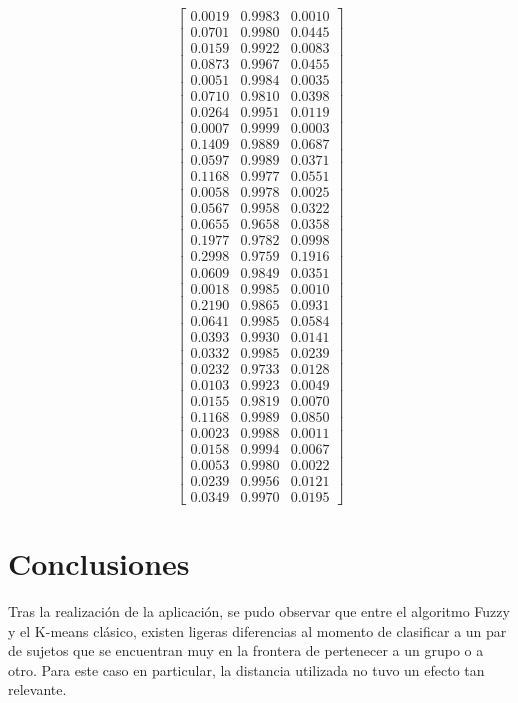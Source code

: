 \documentclass[11pt, letterpaper]{article}
\begin{document}
\[
\begin{bmatrix}
	0.0019 & 0.9983 & 0.0010 \\
	0.0701 & 0.9980 & 0.0445 \\
	0.0159 & 0.9922 & 0.0083 \\
	0.0873 & 0.9967 & 0.0455 \\
	0.0051 & 0.9984 & 0.0035 \\
	0.0710 & 0.9810 & 0.0398 \\
	0.0264 & 0.9951 & 0.0119 \\
	0.0007 & 0.9999 & 0.0003 \\
	0.1409 & 0.9889 & 0.0687 \\
	0.0597 & 0.9989 & 0.0371 \\
	0.1168 & 0.9977 & 0.0551 \\
	0.0058 & 0.9978 & 0.0025 \\
	0.0567 & 0.9958 & 0.0322 \\
	0.0655 & 0.9658 & 0.0358 \\
	0.1977 & 0.9782 & 0.0998 \\
	0.2998 & 0.9759 & 0.1916 \\
	0.0609 & 0.9849 & 0.0351 \\
	0.0018 & 0.9985 & 0.0010 \\
	0.2190 & 0.9865 & 0.0931 \\
	0.0641 & 0.9985 & 0.0584 \\
	0.0393 & 0.9930 & 0.0141 \\
	0.0332 & 0.9985 & 0.0239 \\
	0.0232 & 0.9733 & 0.0128 \\
	0.0103 & 0.9923 & 0.0049 \\
	0.0155 & 0.9819 & 0.0070 \\
	0.1168 & 0.9989 & 0.0850 \\
	0.0023 & 0.9988 & 0.0011 \\
	0.0158 & 0.9994 & 0.0067 \\
	0.0053 & 0.9980 & 0.0022 \\
	0.0239 & 0.9956 & 0.0121 \\
	0.0349 & 0.9970 & 0.0195 
\end{bmatrix}
\]



\newpage

\section{Conclusiones}

Tras la realización de la aplicación, se pudo observar que entre el algoritmo Fuzzy y el K-means clásico, existen ligeras diferencias al momento de clasificar a un par de sujetos que se encuentran muy en la frontera de pertenecer a un grupo o a otro. Para este caso en particular, la distancia utilizada no tuvo un efecto tan relevante. 
\end{document}
